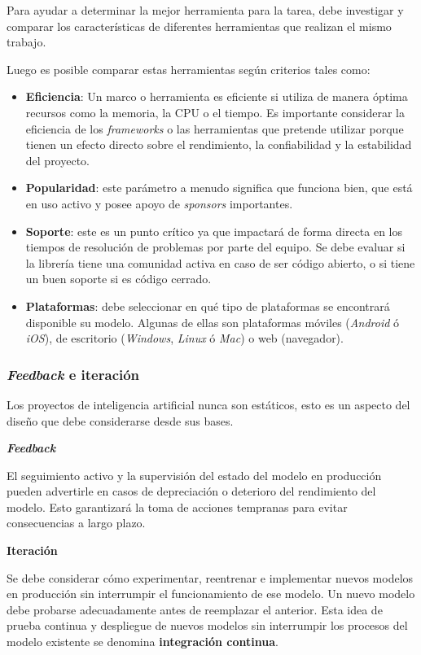 \documentclass[a4paper,12pt]{article}
\begin{document}
		Para ayudar a determinar la mejor herramienta para la tarea, debe investigar y comparar los características de diferentes herramientas que realizan el mismo trabajo. 
				
		Luego es posible comparar estas herramientas según criterios tales como:
		\begin{itemize}[noitemsep, topsep=2pt]
			\item \textbf{Eficiencia}: Un marco o herramienta es eficiente si utiliza de manera óptima recursos como la memoria, la CPU o el tiempo. Es importante considerar la eficiencia de los \textit{frameworks} o las herramientas que pretende utilizar porque tienen un efecto directo sobre el rendimiento, la confiabilidad y la estabilidad del proyecto.
			\item \textbf{Popularidad}: este parámetro a menudo significa que funciona bien, que está en uso activo y posee apoyo de \textit{sponsors} importantes.
			\item \textbf{Soporte}: este es un punto crítico ya que impactará de forma directa en los tiempos de resolución de problemas por parte del equipo. Se debe evaluar si la librería tiene una comunidad activa en caso de ser código abierto, o si tiene un buen soporte si es código cerrado.
			\item \textbf{Plataformas}: debe seleccionar en qué tipo de plataformas se encontrará disponible su modelo. Algunas de ellas son plataformas móviles (\textit{Android} ó \textit{iOS}), de escritorio (\textit{Windows}, \textit{Linux} ó \textit{Mac}) o web (navegador).
		\end{itemize}
						
		\subsubsection{\textit{Feedback} e iteración}
		Los proyectos de inteligencia artificial nunca son estáticos, esto es un aspecto del diseño que debe considerarse desde sus bases.
				
		\textbf{\textit{Feedback}}
				
		El seguimiento activo y la supervisión del estado del modelo en producción pueden advertirle en casos de depreciación o deterioro del rendimiento del modelo. Esto garantizará la toma de acciones tempranas para evitar consecuencias a largo plazo.
				
		\textbf{Iteración}
				
		Se debe considerar cómo experimentar, reentrenar e implementar nuevos modelos en producción sin interrumpir el funcionamiento de ese modelo. Un nuevo modelo debe probarse adecuadamente antes de reemplazar el anterior. Esta idea de prueba continua y despliegue de nuevos modelos sin interrumpir los procesos del modelo existente se denomina \textbf{integración continua}.
				
\end{document}
